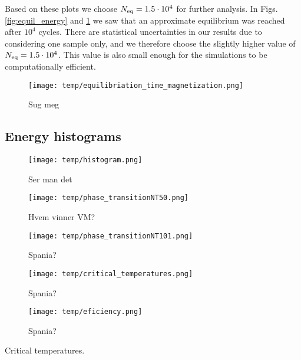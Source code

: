 Based on these plots we choose $N_\mathrm{eq}=1.5\cdot10^4$ for further analysis. In Figs. \ref{fig:equil_energy} and \ref{fig:equil_magn} we saw that an approximate equilibrium was reached after $10^4$ cycles. There are statistical uncertainties in our results due to considering one sample only, and we therefore choose the slightly higher value of $N_\mathrm{eq}=1.5\cdot10^4$. This value is also small enough for the simulations to be computationally efficient. 

\begin{figure}[!ht]
    \texttt{[image: temp/equilibriation\_time\_magnetization.png]}
    \caption{Sug meg}
    \label{fig:equil_magn}
\end{figure}

\subsection{Energy histograms}\label{subsec_results:histogram}
\begin{figure}[!ht]
    \texttt{[image: temp/histogram.png]}
    \caption{Ser man det }
    \label{fig:histogram}
\end{figure}


\begin{figure*}[!ht]
    \texttt{[image: temp/phase\_transitionNT50.png]} 
    \caption{Hvem vinner VM?}
    \label{fig:phase_transition}
\end{figure*} 

\begin{figure}[!ht]
    \texttt{[image: temp/phase\_transitionNT101.png]} 
    \caption{Spania?}
    \label{fig:phase_transition_zoomed}
\end{figure} 

\begin{figure}[!ht]
    \texttt{[image: temp/critical\_temperatures.png]} 
    \caption{Spania?}
    \label{fig:critical_temperatures}
\end{figure} 

\begin{figure}[!ht]
    \texttt{[image: temp/eficiency.png]} 
    \caption{Spania?}
    \label{fig:efficiency}
\end{figure} 





\begin{table}[!ht]
    
    \caption{Critical temperatures.}
    \label{tab:critical_temperatures}
\end{table}

